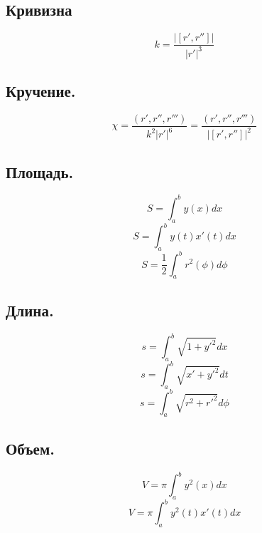 \documentclass[a4paper,14pt]{article}
\begin{document}
    \subsection{Кривизна}
    \[k=\frac{|[r', r'']|}{|r'|^3}\]
    \subsection{Кручение.}
    \[\chi=\frac{(r', r'', r''')}{k^2 |r'|^6}=\frac{(r', r'', r''')}{|[r', r'']|^2}\]
    \subsection{Площадь.}
    \[S=\int_{a}^{b} y(x)dx\]
    \[S=\int_{a}^{b} y(t)x'(t)dx\]
    \[S=\frac 12 \int_{a}^{b} r^2(\phi)d\phi\]
    \subsection{Длина.}
    \[s=\int_{a}^{b} \sqrt{1+y'^2} dx\]
    \[s=\int_{a}^{b} \sqrt{x'+y'^2} dt\]
    \[s=\int_{a}^{b} \sqrt{r^2+r'^2} d\phi\]
    \subsection{Объем.}
    \[V=\pi \int_{a}^{b} y^2(x) dx\]
    \[V=\pi \int_{a}^{b} y^2(t) x'(t) dx\]
\end{document}

